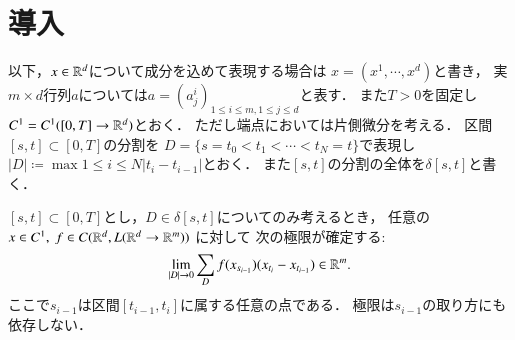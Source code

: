 \section{導入}
	以下，$x \in \mathbb{R}^d$について成分を込めて表現する場合は
	$x = (x^1,\cdots,x^d)$と書き，
	実$m \times d$行列$a$については$a=(a^i_j)_{1 \leq i \leq m,1 \leq j \leq d}$と表す．
	また$T > 0$を固定し$C^1 = C^1([0,T] \rightarrow \mathbb{R}^d)$とおく．
	ただし端点においては片側微分を考える．
	区間$[s,t] \subset [0,T]$の分割を
	$D = \{s = t_0 < t_1 < \cdots < t_N = t\}$で表現し
	$|D| \coloneqq \max{1 \leq i \leq N}{\left| t_i - t_{i-1} \right|}$とおく．
	また$[s,t]$の分割の全体を$\delta[s,t]$と書く．

	\begin{screen}
		\begin{thm}
			$[s,t] \subset [0,T]$とし，$D \in \delta[s,t]$についてのみ考えるとき，
			任意の$x \in C^1,\ f \in C(\mathbb{R}^d,L(\mathbb{R}^d \rightarrow \mathbb{R}^m))$\footnotemark
			に対して
			次の極限が確定する:
			\begin{align}
				\lim_{|D| \to 0}
				\sum_{D} f(x_{s_{i-1}})(x_{t_i} - x_{t_{i-1}})
				\in \mathbb{R}^m.
			\end{align}
			ここで$s_{i-1}$は区間$[t_{i-1},t_i]$に属する任意の点である．
			極限は$s_{i-1}$の取り方にも依存しない．
		\end{thm}
	\end{screen}
